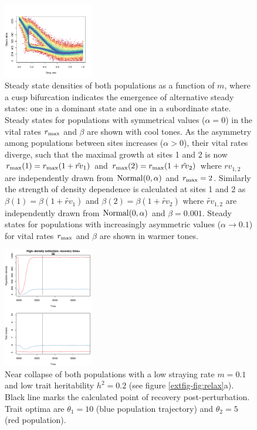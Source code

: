 \documentclass{revtex4}
\begin{document}
\begin{figure}
  \captionsetup{justification=raggedright,
singlelinecheck=false
}
\centering
\includegraphics[width=0.35\textwidth]{fig_asymdensity.pdf}
\caption{
Steady state densities of both populations as a function of $m$, where a cusp bifurcation indicates the emergence of alternative steady states: one in a dominant state and one in a subordinate state.
Steady states for populations with symmetrical values ($\alpha=0$) in the vital rates $r_{\rm max}$ and $\beta$ are shown with cool tones.
As the asymmetry among populations between sites increases ($\alpha>0$), their vital rates diverge, such that the maximal growth at sites 1 and 2 is now $r_{\rm max}(1)=r_{\rm max}(1+\tilde{rv}_1)$ and $r_{\rm max}(2)=r_{\rm max}(1+\tilde{rv}_2)$ where $rv_{1,2}$ are independently drawn from $\rm{Normal}(0,\alpha)$ and $r_{\rm max}=2$. 
Similarly the strength of density dependence is calculated at sites 1 and 2 as $\beta(1)=\beta(1+\tilde{rv}_1)$ and $\beta(2)=\beta(1+\tilde{rv}_2)$ where $\tilde{rv}_{1,2}$ are independently drawn from $\rm{Normal}(0,\alpha)$ and $\beta=0.001$.
Steady states for populations with increasingly asymmetric values ($\alpha\rightarrow 0.1$) for vital rates $r_{\rm max}$ and $\beta$ are shown in warmer tones.
} \label{fig:symmetry}
\end{figure}


\begin{figure}
  \captionsetup{justification=raggedright,
singlelinecheck=false
}
\centering
\includegraphics[width=0.35\textwidth]{fig_relax_both_lowh.pdf}
\caption{
Near collapse of both populations with a low straying rate $m=0.1$ and low trait heritability $h^2=0.2$ (see figure \ref{extfig-fig:relax}a).
Black line marks the calculated point of recovery post-perturbation.
Trait optima are $\theta_1 = 10$ (blue population trajectory) and $\theta_2 = 5$ (red population).
} \label{fig:relaxtraj_bothlh}
\end{figure}
\end{document}
